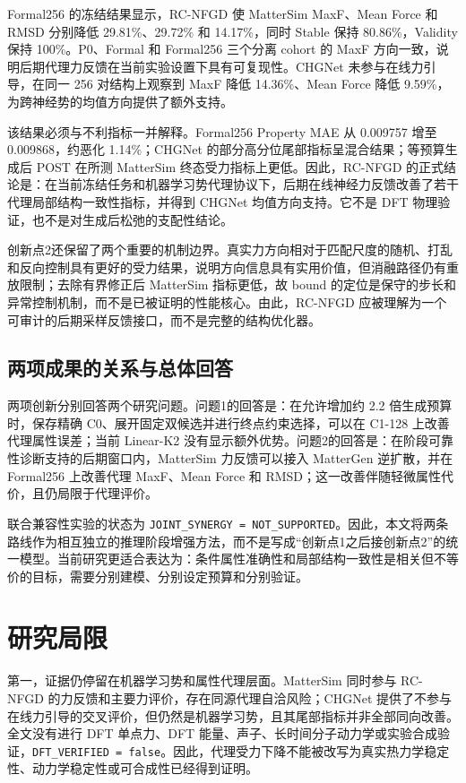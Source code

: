 Formal256 的冻结结果显示，RC-NFGD 使 Matter\allowbreak Sim MaxF、Mean Force 和 RMSD 分别降低 29.81\%、29.72\% 和 14.17\%，同时 Stable 保持 80.86\%，Validity 保持 100\%。P0、Formal 和 Formal256 三个分离 cohort 的 MaxF 方向一致，说明后期代理力反馈在当前实验设置下具有可复现性。CHGNet 未参与在线力引导，在同一 256 对结构上观察到 MaxF 降低 14.36\%、Mean Force 降低 9.59\%，为跨神经势的均值方向提供了额外支持。

该结果必须与不利指标一并解释。Formal256 Property MAE 从 0.009757 增至 0.009868，约恶化 1.14\%；CHGNet 的部分高分位尾部指标呈混合结果；等预算生成后 POST 在所测 Matter\allowbreak Sim 终态受力指标上更低。因此，RC-NFGD 的正式结论是：在当前冻结任务和机器学习势代理协议下，后期在线神经力反馈改善了若干代理局部结构一致性指标，并得到 CHGNet 均值方向支持。它不是 DFT 物理验证，也不是对生成后松弛的支配性结论。

创新点2还保留了两个重要的机制边界。真实力方向相对于匹配尺度的随机、打乱和反向控制具有更好的受力结果，说明方向信息具有实用价值，但消融路径仍有重放限制；去除有界修正后 Matter\allowbreak Sim 指标更低，故 bound 的定位是保守的步长和异常控制机制，而不是已被证明的性能核心。由此，RC-NFGD 应被理解为一个可审计的后期采样反馈接口，而不是完整的结构优化器。

\subsection{两项成果的关系与总体回答}

两项创新分别回答两个研究问题。问题1的回答是：在允许增加约 2.2 倍生成预算时，保存精确 C0、展开固定双候选并进行终点约束选择，可以在 C1-128 上改善代理属性误差；当前 Linear-K2 没有显示额外优势。问题2的回答是：在阶段可靠性诊断支持的后期窗口内，Matter\allowbreak Sim 力反馈可以接入 MatterGen 逆扩散，并在 Formal256 上改善代理 MaxF、Mean Force 和 RMSD；这一改善伴随轻微属性代价，且仍局限于代理评价。

联合兼容性实验的状态为 \texttt{JOINT\_SYNERGY\ =\ NOT\_SUP\allowbreak PORTED}。因此，本文将两条路线作为相互独立的推理阶段增强方法，而不是写成``创新点1之后接创新点2''的统一模型。当前研究更适合表达为：条件属性准确性和局部结构一致性是相关但不等价的目标，需要分别建模、分别设定预算和分别验证。

\section{研究局限}

第一，证据仍停留在机器学习势和属性代理层面。Matter\allowbreak Sim 同时参与 RC-NFGD 的力反馈和主要力评价，存在同源代理自洽风险；CHGNet 提供了不参与在线力引导的交叉评价，但仍然是机器学习势，且其尾部指标并非全部同向改善。全文没有进行 DFT 单点力、DFT 能量、声子、长时间分子动力学或实验合成验证，\texttt{DFT\_VERIFIED\ =\ false}。因此，代理受力下降不能被改写为真实热力学稳定性、动力学稳定性或可合成性已经得到证明。

